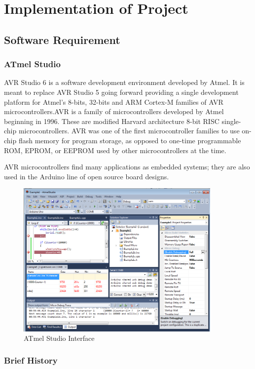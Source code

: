 \documentclass[twoside,a4paper,16pt]{book}
\begin{document}
{\chapter{\bf Implementation of Project }
\section{Software Requirement }
\subsection{ATmel Studio}
AVR Studio 6 is a software development environment developed by Atmel. It is meant to replace AVR Studio 5 going forward providing a single development platform for Atmel's 8-bits, 32-bits and ARM Cortex-M families of AVR microcontrollers.AVR is a family of microcontrollers developed by Atmel beginning in 1996. These are modified Harvard architecture 8-bit RISC single-chip microcontrollers. AVR was one of the first microcontroller families to use on-chip flash memory for program storage, as opposed to one-time programmable ROM, EPROM, or EEPROM used by other microcontrollers at the time.

AVR microcontrollers find many applications as embedded systems; they are also used in the Arduino line of open source board designs.

\begin{figure}
	\begin{center}
		\includegraphics[width=10.0cm]{cc.png}
		\caption{ATmel Studio Interface}
	\end{center}
\end{figure}
\subsection*{Brief History}

}
\end{document}
